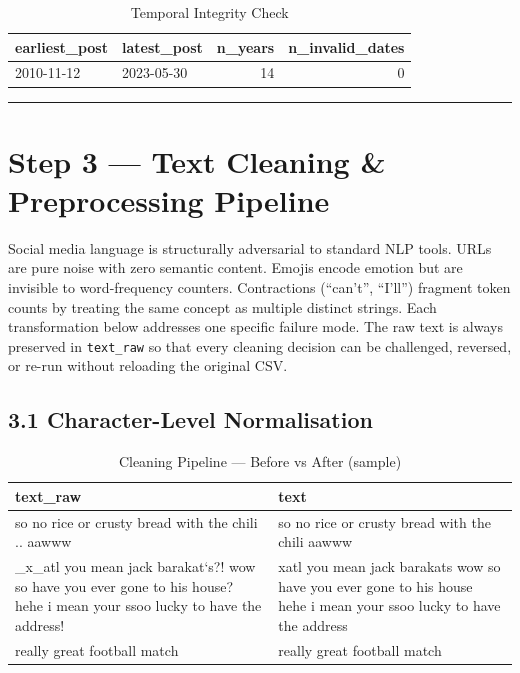 \documentclass[
]{article}
\begin{document}
\begin{longtable}[t]{llrr}
\caption{\label{tab:date-validation}Temporal Integrity Check}\\
\toprule
earliest\_post & latest\_post & n\_years & n\_invalid\_dates\\
\midrule
2010-11-12 & 2023-05-30 & 14 & 0\\
\bottomrule
\end{longtable}

\begin{center}\rule{0.5\linewidth}{0.5pt}\end{center}

\section{Step 3 --- Text Cleaning \& Preprocessing
Pipeline}\label{step-3-text-cleaning-preprocessing-pipeline}

Social media language is structurally adversarial to standard NLP tools.
URLs are pure noise with zero semantic content. Emojis encode emotion
but are invisible to word-frequency counters. Contractions (``can't'',
``I'll'') fragment token counts by treating the same concept as multiple
distinct strings. Each transformation below addresses one specific
failure mode. The raw text is always preserved in \texttt{text\_raw} so
that every cleaning decision can be challenged, reversed, or re-run
without reloading the original CSV.

\subsection{3.1 Character-Level
Normalisation}\label{character-level-normalisation}

\begin{table}[!h]
\centering
\caption{\label{tab:text-cleaning-pipeline}Cleaning Pipeline — Before vs After (sample)}
\centering
\fontsize{10}{12}\selectfont
\begin{tabular}[t]{>{\raggedright\arraybackslash}p{6cm}>{\raggedright\arraybackslash}p{6cm}}
\toprule
\textbf{text\_raw} & \textbf{text}\\
\midrule
so no rice or crusty bread with the chili .. aawww & so no rice or crusty bread with the chili aawww\\
\_x\_atl you mean jack barakat`s?! wow so have you ever
gone to his house? hehe i mean your ssoo lucky to have the
address! & xatl you mean jack barakats wow so have you ever gone to his
house hehe i mean your ssoo lucky to have the address\\
really great football match & really great football match\\
\bottomrule
\end{tabular}
\end{table}
\end{document}
